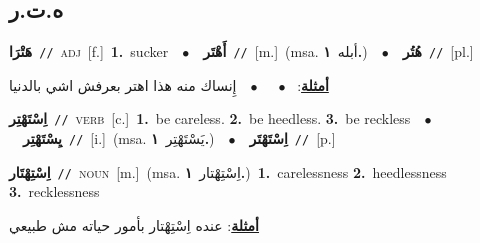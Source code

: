 \documentclass[10pt,a4paper,twoside]{article} %
\begin{document}
\begin{multicols}{2}
{{{{{{{{{{\vspace{-3mm}
\subsection*{\color{blue}\foreignlanguage{arabic}{ه.ت.ر}\color{blue}{}} 

{\setlength\topsep{0pt}\textbf{\foreignlanguage{arabic}{هَتْرَا}}\ {\color{gray}\texttt{//}\color{black}}\ \textsc{adj}\ [f.]\ \textbf{1.}~sucker\ \ $\bullet$\ \ \setlength\topsep{0pt}\textbf{\foreignlanguage{arabic}{أَهْتَر}}\ {\color{gray}\texttt{//}\color{black}}\ [m.]\ \color{gray}(msa. \foreignlanguage{arabic}{أبله}~\foreignlanguage{arabic}{\textbf{١.}})\color{black}\ \ $\bullet$\ \ \setlength\topsep{0pt}\textbf{\foreignlanguage{arabic}{هُتُر}}\ {\color{gray}\texttt{//}\color{black}}\ [pl.]\  \begin{flushright}\color{gray}\foreignlanguage{arabic}{\textbf{\underline{\foreignlanguage{arabic}{أمثلة}}}: \ $\bullet$\ \  \ $\bullet$\ \  إِنساك منه هذا اهتر بعرفش اشي بالدنيا}\end{flushright}\color{black}} \vspace{2mm}

{\setlength\topsep{0pt}\textbf{\foreignlanguage{arabic}{اِسْتَهْتِر}}\ {\color{gray}\texttt{//}\color{black}}\ \textsc{verb}\ [c.]\ \textbf{1.}~be careless.  \textbf{2.}~be heedless.  \textbf{3.}~be reckless\ \ $\bullet$\ \ \setlength\topsep{0pt}\textbf{\foreignlanguage{arabic}{يِسْتَهْتِر}}\ {\color{gray}\texttt{//}\color{black}}\ [i.]\ \color{gray}(msa. \foreignlanguage{arabic}{يَسْتَهْتِر}~\foreignlanguage{arabic}{\textbf{١.}})\color{black}\ \ $\bullet$\ \ \setlength\topsep{0pt}\textbf{\foreignlanguage{arabic}{اِسْتَهْتَر}}\ {\color{gray}\texttt{//}\color{black}}\ [p.]\ 

{\setlength\topsep{0pt}\textbf{\foreignlanguage{arabic}{اِسْتِهْتَار}}\ {\color{gray}\texttt{//}\color{black}}\ \textsc{noun}\ [m.]\ \color{gray}(msa. \foreignlanguage{arabic}{اِسْتِهْتار}~\foreignlanguage{arabic}{\textbf{١.}})\color{black}\ \textbf{1.}~carelessness  \textbf{2.}~heedlessness  \textbf{3.}~recklessness\  \begin{flushright}\color{gray}\foreignlanguage{arabic}{\textbf{\underline{\foreignlanguage{arabic}{أمثلة}}}: عنده اِسْتِهْتار بأمور حياته مش طبيعي}\end{flushright}\color{black}} \vspace{2mm}

}}}}}}}}}}}
\end{multicols}
\end{document}
